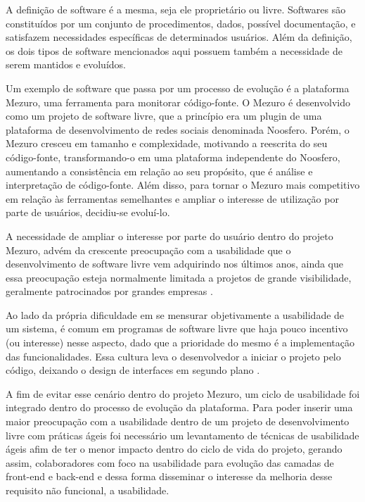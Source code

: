 A definição de software é a mesma, seja ele proprietário ou livre. Softwares são constituídos por um conjunto de procedimentos, dados, possível documentação, e satisfazem necessidades específicas de determinados usuários. Além da definição, os dois tipos de software mencionados aqui possuem também a necessidade de serem mantidos e evoluídos.

Um exemplo de software que passa por um processo de evolução é a plataforma Mezuro, uma ferramenta para monitorar código-fonte. O Mezuro é desenvolvido como um projeto de software livre, que a princípio era um plugin de uma plataforma de desenvolvimento de redes sociais denominada Noosfero. Porém, o Mezuro cresceu em tamanho e complexidade, motivando a reescrita do seu código-fonte, transformando-o em uma plataforma independente do Noosfero, aumentando a consistência em relação ao seu propósito, que é análise e interpretação de código-fonte. Além disso,  para tornar o Mezuro mais competitivo em relação às ferramentas semelhantes e ampliar o interesse de utilização por parte de usuários, decidiu-se evoluí-lo.

A necessidade de ampliar o interesse por parte do usuário dentro do projeto Mezuro, advém da crescente preocupação com a usabilidade que o desenvolvimento de software livre vem adquirindo nos últimos anos, ainda que essa preocupação esteja normalmente limitada a projetos de grande visibilidade, geralmente patrocinados por grandes empresas \cite{nichols2006}.

Ao lado da própria dificuldade em se mensurar objetivamente a usabilidade de um sistema, é comum em programas de software livre que haja pouco incentivo (ou interesse) nesse aspecto, dado que a prioridade do mesmo é a implementação das funcionalidades. Essa cultura leva o desenvolvedor a iniciar o projeto pelo código, deixando o design de interfaces em segundo plano  \cite{thomas2008}.

A fim de evitar esse cenário dentro do projeto Mezuro, um ciclo de usabilidade foi integrado dentro do processo de evolução da plataforma. Para poder inserir uma maior preocupação com a usabilidade dentro de um projeto de desenvolvimento livre com práticas ágeis foi necessário um levantamento de técnicas de usabilidade ágeis afim de ter o menor impacto dentro do ciclo de vida do projeto, gerando assim, colaboradores com foco na usabilidade para evolução das camadas de front-end e back-end e dessa forma disseminar o interesse da melhoria desse requisito não funcional, a usabilidade.

